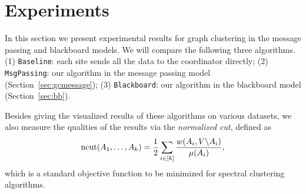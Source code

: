 \newcommand{\twomoons}{{\tt Twomoons}}
\newcommand{\gauss}{{\tt Gauss}}
\newcommand{\sculpture}{{\tt Sculpture}}
\newcommand{\baseline}{{\tt Baseline}}
\newcommand{\MM}{{\tt MsgPassing}}
\newcommand{\blackboard}{{\tt Blackboard}}
\newcommand{\ncut}{\text{ncut}}
\newcommand{\chensays}[2][]{\textcolor{blue} {\textsc{Jiecao #1:} \emph{#2}}}

\section{Experiments}
In this section we present experimental results for  graph clustering in the message passing and blackboard models. We will compare the following three algorithms. (1) \baseline: each site sends all the data to the coordinator directly; (2) \MM: our algorithm in the message passing model (Section~\ref{sec:gcmessage}); (3) 
\blackboard: our algorithm in  the blackboard model (Section~\ref{sec:bb}).


%
%
%
%


Besides giving the visualized results of these algorithms on various datasets, we also measure the qualities of the results via the {\em normalized cut}, defined as 
\[
\ncut(A_1, \ldots, A_{k}) = \frac{1}{2}\sum_{i\in[k]}\frac{w(A_i, V\backslash A_i)}{\vol(A_i)},
\]
 which is a standard objective function to be minimized for spectral clustering algorithms. 

